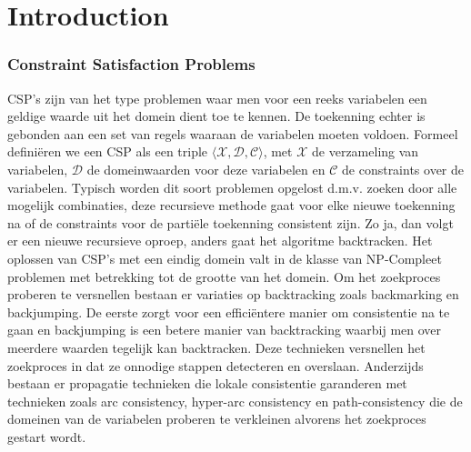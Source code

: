 \chapter{Introduction}
\label{cha:intro}

\subsection{Constraint Satisfaction Problems}
CSP's zijn van het type problemen waar men voor een reeks variabelen een geldige waarde uit het domein dient toe te kennen. De toekenning echter is gebonden aan een set van regels waaraan de variabelen moeten voldoen. Formeel defini\"{e}ren we een CSP als een triple $\langle \mathcal{X},\mathcal{D},\mathcal{C} \rangle$, met $\mathcal{X}$ de verzameling van variabelen, $\mathcal{D}$ de domeinwaarden voor deze variabelen en $\mathcal{C}$ de constraints over de variabelen. Typisch worden dit soort problemen opgelost d.m.v. zoeken door alle mogelijk combinaties, deze recursieve methode gaat voor elke nieuwe toekenning na of de constraints voor de parti\"{e}le toekenning consistent zijn. Zo ja, dan volgt er een nieuwe recursieve oproep, anders gaat het algoritme backtracken. Het oplossen van CSP's met een eindig domein valt in de klasse van NP-Compleet problemen met betrekking tot de grootte van het domein. Om het zoekproces proberen te versnellen bestaan er variaties op backtracking zoals backmarking en backjumping. De eerste zorgt voor een effici\"{e}ntere manier om consistentie na te gaan en backjumping is een betere manier van backtracking waarbij men over meerdere waarden tegelijk kan backtracken. Deze technieken versnellen het zoekproces in dat ze onnodige stappen detecteren en overslaan. Anderzijds bestaan er propagatie technieken die lokale consistentie garanderen met technieken zoals arc consistency, hyper-arc consistency en path-consistency die de domeinen van de variabelen proberen te verkleinen alvorens het zoekproces gestart wordt. 


